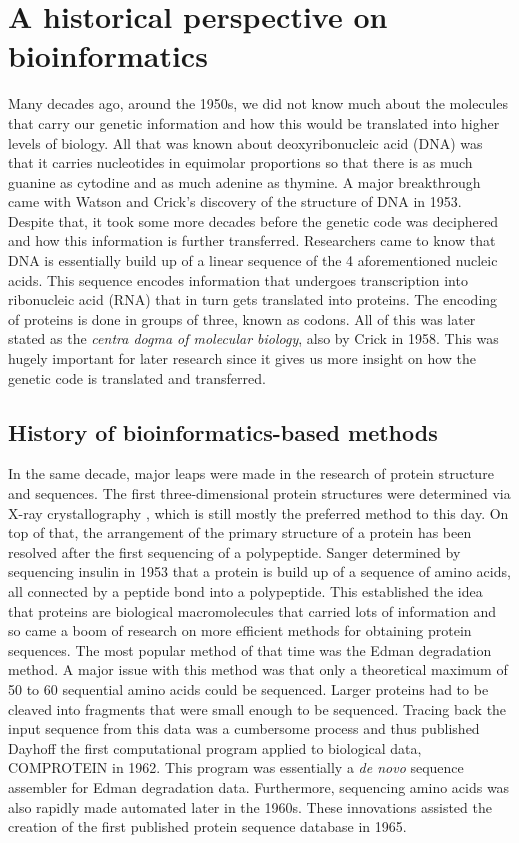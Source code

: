 \section{A historical perspective on bioinformatics}
Many decades ago, around the 1950s, we did not know much about the molecules that carry our genetic information and how this would be translated into higher levels of biology. All that was known about deoxyribonucleic acid (DNA) was that it carries nucleotides in equimolar proportions so that there is as much guanine as cytodine and as much adenine as thymine. A major breakthrough came with Watson and Crick's discovery of the structure of DNA in 1953\cite{dnastruct}. Despite that, it took some more decades before the genetic code was deciphered and how this information is further transferred. Researchers came to know that DNA is essentially build up of a linear sequence of the 4 aforementioned nucleic acids. This sequence encodes information that undergoes transcription into ribonucleic acid (RNA) that in turn gets translated into proteins. The encoding of proteins is done in groups of three, known as codons. All of this was later stated as the \textit{centra dogma of molecular biology}, also by Crick in 1958\cite{dogma}. This was hugely important for later research since it gives us more insight on how the genetic code is translated and transferred.

\subsection{History of bioinformatics-based methods}
In the same decade, major leaps were made in the research of protein structure and sequences. The first three-dimensional protein structures were determined via X-ray crystallography \cite{xray}, which is still mostly the preferred method to this day. On top of that, the arrangement of the primary structure of a protein has been resolved after the first sequencing of a polypeptide. Sanger determined by sequencing insulin in 1953\cite{insulin} that a protein is build up of a sequence of amino acids, all connected by a peptide bond into a polypeptide. This established the idea that proteins are biological macromolecules that carried lots of information\cite{primstruct} and so came a boom of research on more efficient methods for obtaining protein sequences. The most popular method of that time was the Edman degradation method. A major issue with this method was that only a theoretical maximum of 50 to 60 sequential amino acids could be sequenced. Larger proteins had to be cleaved into fragments that were small enough to be sequenced. Tracing back the input sequence from this data was a cumbersome process and thus published Dayhoff the first computational program applied to biological data, COMPROTEIN\cite{comprotein} in 1962. This program was essentially a \textit{de novo} sequence assembler for Edman degradation data. Furthermore, sequencing amino acids was also rapidly made automated later in the 1960s. These innovations assisted the creation of the first published protein sequence database\cite{atlas} in 1965.


